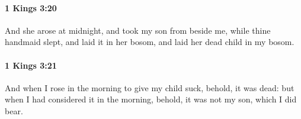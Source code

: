 		\paragraph{1 Kings 3:20} %
			\label{1KINGS-3-20}

			And she arose at midnight, and took my son from beside me, while thine handmaid slept, and laid it in her bosom, and laid her dead child in my bosom.


		\paragraph{1 Kings 3:21} %
			\label{1KINGS-3-21}

			And when I rose in the morning to give my child suck, behold, it was dead: but when I had considered it in the morning, behold, it was not my son, which I did bear.


